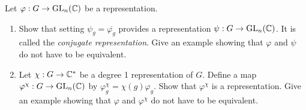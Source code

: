 \begin{exercise}
    Let $\varphi : G \to \text{GL}_{n}(\mathbb{C})$ be a representation.
    \begin{enumerate}
        \item Show that setting $\psi_g = \overline{\varphi_g}$ provides a representation $\psi : G \to \text{GL}_{n}(\mathbb{C})$. It is called the \textit{conjugate representation}. Give an example showing that $\varphi$ and $\psi$ do not have to be equivalent.
        \item Let $\chi : G \to \mathbb{C}^*$ be a degree 1 representation of $G$. Define a map $\varphi^{\chi} : G \to \text{GL}_{n}(\mathbb{C})$ by $\varphi_g^{\chi} = \chi(g)\varphi_g$. Show that $\varphi^{\chi}$ is a representation. Give an example showing that $\varphi$ and $\varphi^{\chi}$ do not have to be equivalent. \\
    \end{enumerate}
\end{exercise}

